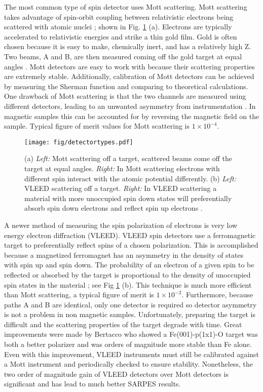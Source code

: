 \documentclass[12pt]{article}
\begin{document}
The most common type of spin detector uses Mott scattering.
Mott scattering takes advantage of spin-orbit coupling between relativistic electrons being scattered with atomic nuclei \cite{Mott}; shown in Fig. \ref{fig:detectortypes} (a).
Electrons are typically accelerated to relativistic energies and strike a thin gold film.
Gold is often chosen because it is easy to make, chemically inert, and has a relatively high Z.
Two beams, A and B, are then measured coming off the gold target at equal angles \cite{Hoesch}.
Mott detectors are easy to work with because their scattering properties are extremely stable.
Additionally, calibration of Mott detectors can be achieved by measuring the Sherman function and comparing to theoretical calculations.
One drawback of Mott scattering is that the two channels are measured using different detectors, leading to an unwanted asymmetry from instrumentation \cite{Okuda-Kimura}.
In magnetic samples this can be accounted for by reversing the magnetic field on the sample.
Typical figure of merit values for Mott scattering is $1\times10^{-4}$.

\begin{figure}[h]
  \centering
  \texttt{[image: fig/detectortypes.pdf]}
  \caption{(a) \textit{Left:}  Mott scattering off a target, scattered beams come off the target at equal angles.  \textit{Right:}  In Mott scattering electrons with different spin interact with the atomic potential differently.  (b) \textit{Left:}  VLEED scattering off a target.  \textit{Right:}  In VLEED scattering a material with more unoccupied spin down states will preferentially absorb spin down electrons and reflect spin up electrons \cite{Okuda-Kimura}.}
  \label{fig:detectortypes}
\end{figure}

A newer method of measuring the spin polarization of electrons is very low energy electron diffraction (VLEED).
VLEED spin detectors use a ferromagnetic target to preferentially reflect spins of a chosen polarization.
This is accomplished because a magnetized ferromagnet has an asymmetry in the density of states with spin up and spin down.
The probability of an electron of a given spin to be reflected or absorbed by the target is proportional to the density of unoccupied spin states in the material \cite{Okuda-Kimura}; see Fig \ref{fig:detectortypes} (b).
This technique is much more efficient than Mott scattering, a typical figure of merit is $1\times10^{-2}$.
Furthermore, because paths A and B are identical, only one detector is required so detector asymmetry is not a problem in non magnetic samples.
Unfortunately, preparing the target is difficult and the scattering properties of the target degrade with time.
Great improvements were made by Bertacco \cite{Bertacco} who showed a Fe(001)-p(1x1)-O target was both a better polarizer and was orders of magnitude more stable than Fe alone.
Even with this improvement, VLEED instruments must still be calibrated against a Mott instrument and periodically checked to ensure stability.
Nonetheless, the two order of magnitude gain of VLEED detectors over Mott detectors is significant and has lead to much better SARPES results.
\end{document}
